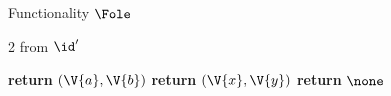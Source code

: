 \begin{interface}[nofloat]{Functionality $\Fole$ \\
}
{\begin{multicols}{2}
 \quad from $\id'$
\begin{algorithmic}[1]
\algcont
{}
  \State \textbf{return} $(\V{a}, \V{b})$ \label{ln:oleleaks}
\EndIf
{}
  \State \textbf{return} $(\V{x}, \V{y})$ \label{ln:oleleakr}
\EndIf
\State \textbf{return} $\none$
\algsave
\end{algorithmic}
\end{multicols}}
\end{interface}
